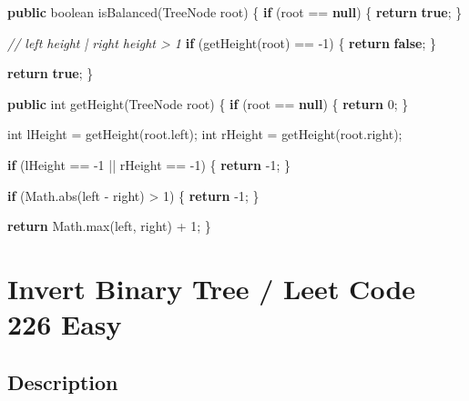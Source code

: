 \documentclass[]{book}
\newenvironment{Shaded}{\begin{snugshade}}{\end{snugshade}}
\newcommand{\BuiltInTok}[1]{#1}
\newcommand{\CommentTok}[1]{\textcolor[rgb]{0.56,0.35,0.01}{\textit{#1}}}
\newcommand{\DataTypeTok}[1]{\textcolor[rgb]{0.13,0.29,0.53}{#1}}
\newcommand{\DecValTok}[1]{\textcolor[rgb]{0.00,0.00,0.81}{#1}}
\newcommand{\FunctionTok}[1]{\textcolor[rgb]{0.00,0.00,0.00}{#1}}
\newcommand{\KeywordTok}[1]{\textcolor[rgb]{0.13,0.29,0.53}{\textbf{#1}}}
\newcommand{\NormalTok}[1]{#1}
\begin{document}
\begin{Shaded}
\begin{Highlighting}[]
\KeywordTok{public} \DataTypeTok{boolean} \FunctionTok{isBalanced}\NormalTok{(}\BuiltInTok{TreeNode}\NormalTok{ root) \{}
    \KeywordTok{if}\NormalTok{ (root == }\KeywordTok{null}\NormalTok{) \{}
        \KeywordTok{return} \KeywordTok{true}\NormalTok{;}
\NormalTok{    \}}

    \CommentTok{// left height | right height > 1}
    \KeywordTok{if}\NormalTok{ (}\FunctionTok{getHeight}\NormalTok{(root) == }\DecValTok{-1}\NormalTok{) \{}
        \KeywordTok{return} \KeywordTok{false}\NormalTok{;}
\NormalTok{    \}}

    \KeywordTok{return} \KeywordTok{true}\NormalTok{;}
\NormalTok{\}}

\KeywordTok{public} \DataTypeTok{int} \FunctionTok{getHeight}\NormalTok{(}\BuiltInTok{TreeNode}\NormalTok{ root) \{}
    \KeywordTok{if}\NormalTok{ (root == }\KeywordTok{null}\NormalTok{) \{}
        \KeywordTok{return} \DecValTok{0}\NormalTok{;}
\NormalTok{    \}}

    \DataTypeTok{int}\NormalTok{ lHeight = }\FunctionTok{getHeight}\NormalTok{(root.}\FunctionTok{left}\NormalTok{);}
    \DataTypeTok{int}\NormalTok{ rHeight = }\FunctionTok{getHeight}\NormalTok{(root.}\FunctionTok{right}\NormalTok{);}

    \KeywordTok{if}\NormalTok{ (lHeight == }\DecValTok{-1}\NormalTok{ || rHeight == }\DecValTok{-1}\NormalTok{) \{}
        \KeywordTok{return} \DecValTok{-1}\NormalTok{;}
\NormalTok{    \}}

    \KeywordTok{if}\NormalTok{ (}\BuiltInTok{Math}\NormalTok{.}\FunctionTok{abs}\NormalTok{(left - right) > }\DecValTok{1}\NormalTok{) \{}
        \KeywordTok{return} \DecValTok{-1}\NormalTok{;}
\NormalTok{    \}}

    \KeywordTok{return} \BuiltInTok{Math}\NormalTok{.}\FunctionTok{max}\NormalTok{(left, right) + }\DecValTok{1}\NormalTok{;}
\NormalTok{\}}
\end{Highlighting}
\end{Shaded}

\hypertarget{invert-binary-tree-leet-code-226-easy}{%
\section{Invert Binary Tree / Leet Code 226 Easy}\label{invert-binary-tree-leet-code-226-easy}}

\hypertarget{description-52}{%
\subsection{Description}\label{description-52}}
\end{document}
